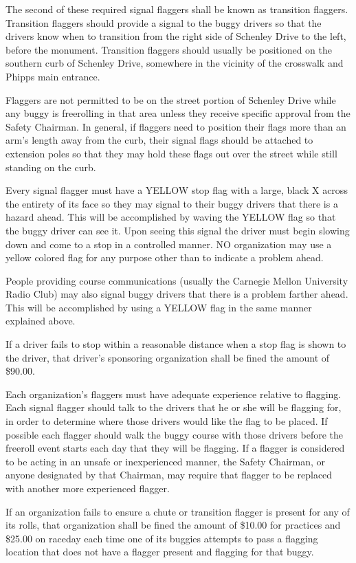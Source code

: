 	The second of these required signal flaggers shall be known as transition flaggers. Transition flaggers should provide a signal to the buggy drivers so that the drivers know when to transition from the right side of Schenley Drive to the left, before the monument. Transition flaggers should usually be positioned on the southern curb of Schenley Drive, somewhere in the vicinity of the crosswalk and Phipps main entrance.

	Flaggers are not permitted to be on the street portion of Schenley Drive while any buggy is freerolling in that area unless they receive specific approval from the Safety Chairman. In general, if flaggers need to position their flags more than an arm's length away from the curb, their signal flags should be attached to extension poles so that they may hold these flags out over the street while still standing on the curb.

	Every signal flagger must have a YELLOW stop flag with a large, black X across the entirety of its face so they may signal to their buggy drivers that there is a hazard ahead. This will be accomplished by waving the YELLOW flag so that the buggy driver can see it. Upon seeing this signal the driver must begin slowing down and come to a stop in a controlled manner. NO organization may use a yellow colored flag for any purpose other than to indicate a problem ahead.

	People providing course communications (usually the Carnegie Mellon University Radio Club) may also signal buggy drivers that there is a problem farther ahead. This will be accomplished by using a YELLOW flag in the same manner explained above.

	If a driver fails to stop within a reasonable distance when a stop flag is shown to the driver, that driver's sponsoring organization shall be fined the amount of \$90.00.

	Each organization's flaggers must have adequate experience relative to flagging. Each signal flagger should talk to the drivers that he or she will be flagging for, in order to determine where those drivers would like the flag to be placed. If possible each flagger should walk the buggy course with those drivers before the freeroll event starts each day that they will be flagging. If a flagger is considered to be acting in an unsafe or inexperienced manner, the Safety Chairman, or anyone designated by that Chairman, may require that flagger to be replaced with another more experienced flagger.

	If an organization fails to ensure a chute or transition flagger is present for any of its rolls, that organization shall be fined the amount of \$10.00 for practices and \$25.00 on raceday each time one of its buggies attempts to pass a flagging location that does not have a flagger present and flagging for that buggy.

